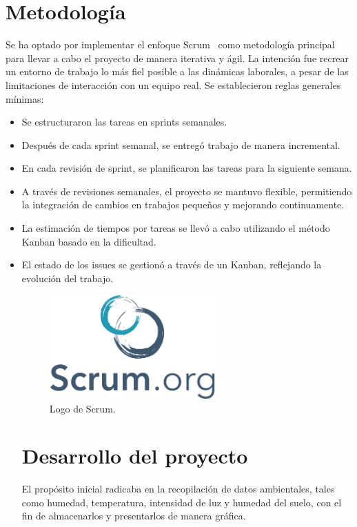 \section{Metodología}
Se ha optado por implementar el enfoque Scrum~\cite{misc:Scrum} como metodología principal para llevar a cabo el proyecto de manera iterativa y ágil. La intención fue recrear un entorno de trabajo lo más fiel posible a las dinámicas laborales, a pesar de las limitaciones de interacción con un equipo real. Se establecieron reglas generales mínimas:
\begin{itemize}
	\item Se estructuraron las tareas en sprints semanales.
	\item Después de cada sprint semanal, se entregó trabajo de manera incremental.
	\item En cada revisión de sprint, se planificaron las tareas para la siguiente semana.
	\item A través de revisiones semanales, el proyecto se mantuvo flexible, permitiendo la integración de cambios en trabajos pequeños y mejorando continuamente.
	\item La estimación de tiempos por tareas se llevó a cabo utilizando el método Kanban basado en la dificultad.
	\item El estado de los issues se gestionó a través de un Kanban, reflejando la evolución del trabajo.
\begin{itemize}

\begin{figure}[h]
    \centering
    \includegraphics[width=0.6\textwidth]{img/herramientas/scrum.png}
    \caption{Logo de Scrum.} \label{Img:scrum}
\end{figure}

\section{Desarrollo del proyecto}

El propósito inicial radicaba en la recopilación de datos ambientales, tales como humedad, temperatura, intensidad de luz y humedad del suelo, con el fin de almacenarlos y presentarlos de manera gráfica.\\


\end{itemize}
\end{itemize}
